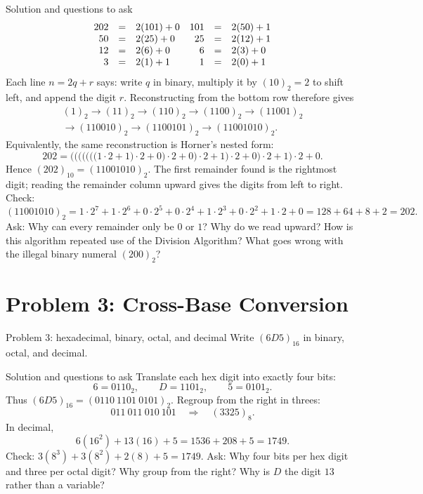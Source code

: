 \documentclass[10pt]{article}
\begin{document}
\begin{solutionbox}{Solution and questions to ask}
\[
\begin{array}{rcl@{\quad}rcl}
202&=&2(101)+0&101&=&2(50)+1\\
50&=&2(25)+0&25&=&2(12)+1\\
12&=&2(6)+0&6&=&2(3)+0\\
3&=&2(1)+1&1&=&2(0)+1
\end{array}
\]
Each line $n=2q+r$ says: write $q$ in binary, multiply it by
$(10)_2=2$ to shift left, and append the digit $r$. Reconstructing from the
bottom row therefore gives
\[
\begin{gathered}
(1)_2\longrightarrow(11)_2\longrightarrow(110)_2
\longrightarrow(1100)_2\longrightarrow(11001)_2\\
\longrightarrow(110010)_2\longrightarrow(1100101)_2
\longrightarrow(11001010)_2.
\end{gathered}
\]
Equivalently, the same reconstruction is Horner's nested form:
\[
202=\bigl(\bigl(\bigl(\bigl(\bigl(\bigl(\bigl(1\cdot2+1\bigr)\cdot2+0\bigr)
\cdot2+0\bigr)\cdot2+1\bigr)\cdot2+0\bigr)\cdot2+1\bigr)\cdot2+0.
\]
Hence $(202)_{10}=(11001010)_2$. The first remainder found is the rightmost
digit; reading the remainder column upward gives the digits from left to right.
Check:
\[
(11001010)_2
=1\cdot2^7+1\cdot2^6+0\cdot2^5+0\cdot2^4
 +1\cdot2^3+0\cdot2^2+1\cdot2+0
=128+64+8+2=202.
\]
Ask: Why can every remainder only be $0$ or $1$? Why do we read upward? How
is this algorithm repeated use of the Division Algorithm? What goes wrong with
the illegal binary numeral $(200)_2$?
\end{solutionbox}

\section*{Problem 3: Cross-Base Conversion}
\begin{promptbox}{Problem 3: hexadecimal, binary, octal, and decimal}
Write $(6D5)_{16}$ in binary, octal, and decimal.
\end{promptbox}

\begin{solutionbox}{Solution and questions to ask}
Translate each hex digit into exactly four bits:
\[
6=0110_2,\qquad D=1101_2,\qquad5=0101_2.
\]
Thus $(6D5)_{16}=(0110\ 1101\ 0101)_2$. Regroup from the right in threes:
\[
011\ 011\ 010\ 101\quad\Longrightarrow\quad(3325)_8.
\]
In decimal,
\[
6(16^2)+13(16)+5=1536+208+5=1749.
\]
Check: $3(8^3)+3(8^2)+2(8)+5=1749$.
Ask: Why four bits per hex digit and three per octal digit? Why group from the
right? Why is $D$ the digit $13$ rather than a variable?
\end{solutionbox}
\end{document}

